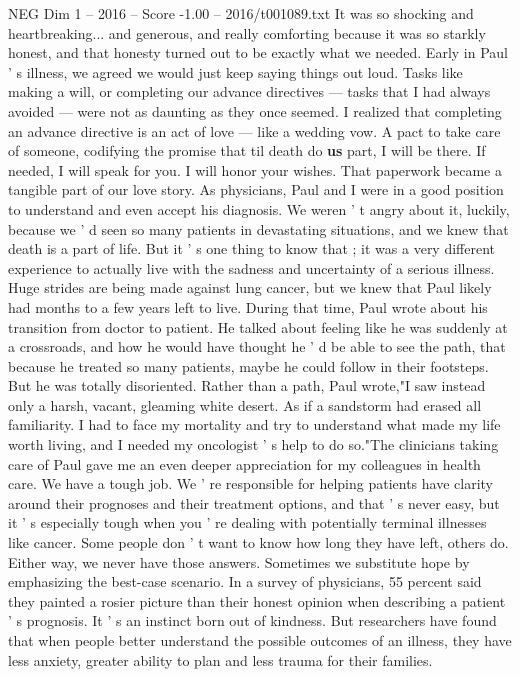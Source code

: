 \begin{textsample}{NEG Dim 1 – 2016 – Score -1.00 – 2016/t001089.txt}
It was so shocking and heartbreaking... and generous, and really comforting because it was so starkly honest, and that honesty turned out to be exactly what we needed.
Early in Paul ' s illness, we agreed we would just keep saying things out loud.
Tasks like making a will, or completing our advance directives — tasks that I had always avoided — were not as daunting as they once seemed.
I realized that completing an advance directive is an act of love — like a wedding vow.
A pact to take care of someone, codifying the promise that til death do \textbf{us} part, I will be there.
If needed, I will speak for you.
I will honor your wishes.
That paperwork became a tangible part of our love story.
As physicians, Paul and I were in a good position to understand and even accept his diagnosis.
We weren ' t angry about it, luckily, because we ' d seen so many patients in devastating situations, and we knew that death is a part of life.
But it ' s one thing to know that ; it was a very different experience to actually live with the sadness and uncertainty of a serious illness.
Huge strides are being made against lung cancer, but we knew that Paul likely had months to a few years left to live.
During that time, Paul wrote about his transition from doctor to patient.
He talked about feeling like he was suddenly at a crossroads, and how he would have thought he ' d be able to see the path, that because he treated so many patients, maybe he could follow in their footsteps.
But he was totally disoriented.
Rather than a path, Paul wrote,"I saw instead only a harsh, vacant, gleaming white desert.
As if a sandstorm had erased all familiarity.
I had to face my mortality and try to understand what made my life worth living, and I needed my oncologist ' s help to do so."The clinicians taking care of Paul gave me an even deeper appreciation for my colleagues in health care.
We have a tough job.
We ' re responsible for helping patients have clarity around their prognoses and their treatment options, and that ' s never easy, but it ' s especially tough when you ' re dealing with potentially terminal illnesses like cancer.
Some people don ' t want to know how long they have left, others do.
Either way, we never have those answers.
Sometimes we substitute hope by emphasizing the best-case scenario.
In a survey of physicians, 55 percent said they painted a rosier picture than their honest opinion when describing a patient ' s prognosis.
It ' s an instinct born out of kindness.
But researchers have found that when people better understand the possible outcomes of an illness, they have less anxiety, greater ability to plan and less trauma for their families.

\end{textsample}
